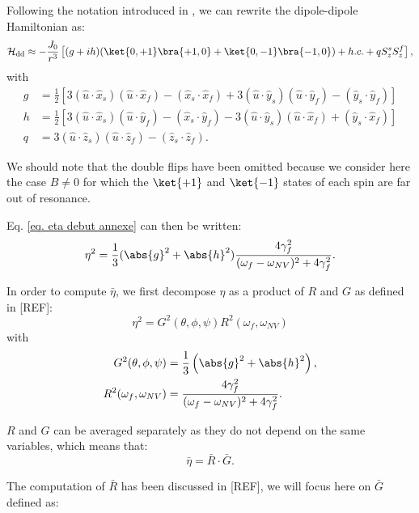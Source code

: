 \documentclass[a4paper,11pt]{report}
\begin{document}
Following the notation introduced in \citep{choi2017depolarization}, we can rewrite the dipole-dipole Hamiltonian as:
\begin{equation}
\mathcal{H}_{\rm dd} \approx -\frac{J_0}{r^3}\left[(g+ih)(\ket{0,+1}\bra{+1,0}+\ket{0,-1}\bra{-1,0}) + h.c. + q S_z^sS_z^f \right],
\end{equation}
with 
\begin{align}
g&=\frac{1}{2}\left[3(\hat{u}\cdot\hat{x}_s)(\hat{u}\cdot\hat{x}_f) - (\hat{x}_s \cdot \hat{x}_f) + 3(\hat{u}\cdot\hat{y}_s)(\hat{u}\cdot\hat{y}_f) - (\hat{y}_s \cdot \hat{y}_f) \right] \\
h&=\frac{1}{2}\left[3(\hat{u}\cdot\hat{x}_s)(\hat{u}\cdot\hat{y}_f) - (\hat{x}_s \cdot \hat{y}_f) - 3(\hat{u}\cdot\hat{y}_s)(\hat{u}\cdot\hat{x}_f) + (\hat{y}_s \cdot \hat{x}_f) \right] \\
q&= 3(\hat{u}\cdot \hat{z}_s)(\hat{u}\cdot \hat{z}_f) - (\hat{z}_s \cdot \hat{z}_f).
\end{align}

We should note that the double flips have been omitted because we consider here the case $B\neq0$ for which the $\ket{+1}$ and $\ket{-1}$ states of each spin are far out of resonance.

Eq. \ref{eq. eta debut annexe} can then be written:
\begin{equation}
\eta^2=\frac{1}{3} (\abs{g}^2 + \abs{h}^2) \frac{4\gamma_f^2}{(\omega_f - \omega_{NV})^2+4\gamma_f^2}.
\end{equation}

In order to compute $\bar \eta$, we first decompose $\eta$ as a product of $R$ and $G$ as defined in [REF]:
\begin{equation}
\eta^2=G^2(\theta, \phi, \psi) R^2(\omega_f,\omega_{NV})
\end{equation}
with
\begin{align*}
G^2(\theta, \phi, \psi)&=\frac{1}{3}\left(\abs{g}^2+\abs{h}^2 \right),  \\ 
R^2(\omega_f,\omega_{NV}) &= \frac{4\gamma_f^2}{(\omega_f - \omega_{NV})^2+4\gamma_f^2}.
\end{align*}

$R$ and $G$ can be averaged separately as they do not depend on the same variables, which means that:
\begin{equation}
\label{eq. eta bar r bar g bar}
\bar \eta = \bar R \cdot \bar G.
\end{equation} 

The computation of $\bar{R}$ has been discussed in [REF], we will focus here on $\bar{G}$ defined as:
\end{document}
